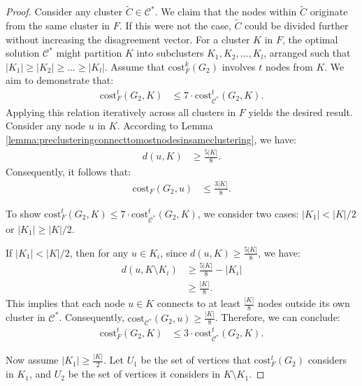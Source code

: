 \documentclass[11pt]{article}
\newcommand{\cost}{\mathrm{cost}}
\begin{document}
\begin{CJK*}{UTF8}{gbsn}
\begin{proof}
Consider any cluster $\tilde{C} \in \mathcal{C}^*$. We claim that the nodes within $\tilde{C}$ originate from the same cluster in $F$. If this were not the case, $\tilde{C}$ could be divided further without increasing the disagreement vector. For a cluster $K$ in $F$, the optimal solution $\mathcal{C}^*$ might partition $K$ into subclusters $K_1, K_2, \ldots, K_l$, arranged such that $|K_1| \geq |K_2| \geq \ldots \geq |K_l|$. Assume that $\cost^k_{F}(G_2)$ involves $t$ nodes from $K$. We aim to demonstrate that:
\begin{align*}
    \cost^t_{F}(G_2, K) &\leq 7 \cdot \cost^t_{\mathcal{C}^*}(G_2, K).
\end{align*}
Applying this relation iteratively across all clusters in $F$ yields the desired result. Consider any node $u$ in $K$. According to Lemma \ref{lemma:preclusteringconnecttomostnodesinsameclustering}, we have:
\begin{align*}
    d(u, K) &\geq \frac{5|K|}{8}.
\end{align*}
Consequently, it follows that:
\begin{align*}
    \cost_{F}(G_2, u) &\leq \frac{3|K|}{8}.
\end{align*}

To show $\cost^t_{F}(G_2, K) \leq 7\cdot \cost^t_{\mathcal{C}^*}(G_2, K)$, we consider two cases: $|K_1| < |K|/2$ or $|K_1| \geq |K|/2$. 

If $|K_1| < |K|/2$, then for any $u \in K_i$, since $d(u, K) \geq \frac{5|K|}{8}$, we have:
\begin{align*}
    d(u, K \setminus K_i) &\geq \frac{5|K|}{8} - |K_i| \\
    &\geq \frac{|K|}{8}.
\end{align*}
This implies that each node $u \in K$ connects to at least $\frac{|K|}{8}$ nodes outside its own cluster in $\mathcal{C}^*$. Consequently, $\cost_{\mathcal{C}^*}(G_2, u) \geq \frac{|K|}{8}$. Therefore, we can conclude:
\begin{align*}
    \cost^t_{F}(G_2, K) &\leq 3 \cdot \cost^t_{\mathcal{C}^*}(G_2, K).
\end{align*}

Now assume $|K_1| \geq \frac{|K|}{2}$. Let $U_1$ be the set of vertices that $\cost^t_{F}(G_2)$ considers in $K_1$, and $U_2$ be the set of vertices it considers in $K \setminus K_1$. 


\end{proof}
\end{CJK*}
\end{document}
